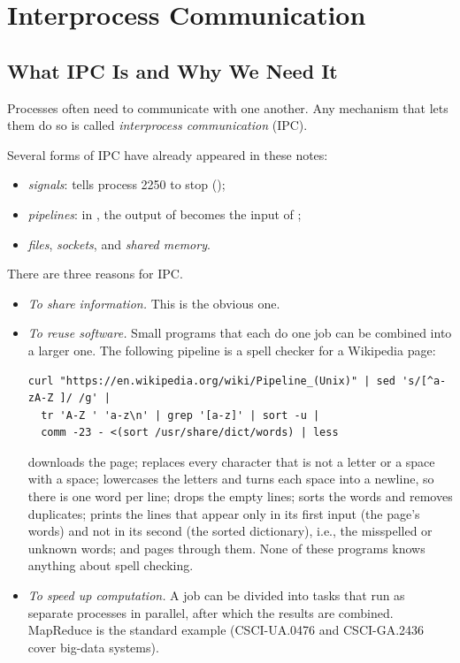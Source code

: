 \section{Interprocess Communication}
\label{sec:ipc}

\subsection{What IPC Is and Why We Need It}

\begin{definition}
  Processes often need to communicate with one another. Any mechanism that lets them do so is called \emph{interprocess communication} (IPC).
\end{definition}

Several forms of IPC have already appeared in these notes:
\begin{itemize}
  \item \emph{signals}:  tells process 2250 to stop ();
  \item \emph{pipelines}: in , the output of  becomes the input of ;
  \item \emph{files}, \emph{sockets}, and \emph{shared memory}.
\end{itemize}

There are three reasons for IPC.
\begin{itemize}
  \item \emph{To share information.} This is the obvious one.
  \item \emph{To reuse software.} Small programs that each do one job can be combined into a larger one. The following pipeline is a spell checker for a Wikipedia page:
\begin{lstlisting}[style=sh]
curl "https://en.wikipedia.org/wiki/Pipeline_(Unix)" | sed 's/[^a-zA-Z ]/ /g' |
  tr 'A-Z ' 'a-z\n' | grep '[a-z]' | sort -u |
  comm -23 - <(sort /usr/share/dict/words) | less
\end{lstlisting}
   downloads the page;  replaces every character that is not a letter or a space with a space;  lowercases the letters and turns each space into a newline, so there is one word per line;  drops the empty lines;  sorts the words and removes duplicates;  prints the lines that appear only in its first input (the page's words) and not in its second (the sorted dictionary), i.e., the misspelled or unknown words; and  pages through them. None of these programs knows anything about spell checking.
  \item \emph{To speed up computation.} A job can be divided into tasks that run as separate processes in parallel, after which the results are combined. MapReduce is the standard example (CSCI-UA.0476 and CSCI-GA.2436 cover big-data systems).
\end{itemize}

